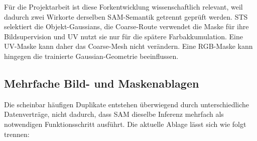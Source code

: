 Für die Projektarbeit ist diese Forkentwicklung wissenschaftlich relevant,
weil dadurch zwei Wirkorte derselben SAM-Semantik getrennt geprüft werden.
STS selektiert die Objekt-Gaussians, die Coarse-Route verwendet die Maske für
ihre Bildsupervision und UV nutzt sie nur für die spätere Farbakkumulation.
Eine UV-Maske kann daher das Coarse-Mesh nicht verändern. Eine RGB-Maske kann
hingegen die trainierte Gaussian-Geometrie beeinflussen.

\subsection{Mehrfache Bild- und Maskenablagen}

Die scheinbar häufigen Duplikate entstehen überwiegend durch unterschiedliche
Datenverträge, nicht dadurch, dass SAM dieselbe Inferenz mehrfach als
notwendigen Funktionsschritt ausführt. Die aktuelle Ablage lässt sich wie folgt
trennen:

